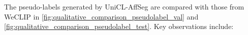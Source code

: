 



      




The pseudo-labels generated by UniCL-AffSeg are compared with those from WeCLIP in \autoref{fig:qualitative_comparison_pseudolabel_val} and \autoref{fig:qualitative_comparison_pseudolabel_test}. Key observations include:

